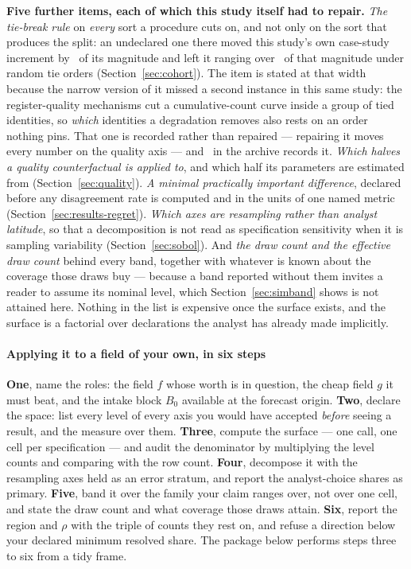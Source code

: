 \textbf{Five further items, each of which this study itself had to
repair.} \emph{The tie-break rule} on \emph{every} sort a procedure cuts on,
and not only on the sort that produces the split: an undeclared one there
moved this study's own case-study increment by
\tiebreakShiftPct\ of its magnitude and left it ranging over
\tiebreakRangeSharePct\ of that magnitude under random tie orders
(Section~\ref{sec:cohort}). The item is stated at that width because the
narrow version of it missed a second instance in this same study: the
register-quality mechanisms cut a cumulative-count curve inside a group of
tied identities, so \emph{which} identities a degradation removes also rests
on an order nothing pins. That one is recorded rather than
repaired --- repairing it moves every number on the quality axis --- and
\reproduceguide\ in the archive records it. \emph{Which halves a quality
counterfactual is applied to}, and which half its parameters are estimated
from (Section~\ref{sec:quality}). \emph{A minimal practically important
difference}, declared before any disagreement rate is computed and in the
units of one named metric (Section~\ref{sec:results-regret}).
\emph{Which axes are resampling rather than analyst latitude}, so that a
decomposition is not read as specification sensitivity when it is sampling
variability (Section~\ref{sec:sobol}). And \emph{the draw count and the
\emph{effective} draw count} behind every band, together with whatever is
known about the coverage those draws buy --- because a band reported without
them invites a reader to assume its nominal level, which
Section~\ref{sec:simband} shows is not attained here. Nothing in the list is
expensive once the surface exists, and the surface is a factorial over
declarations the analyst has already made implicitly.

\paragraph{Applying it to a field of your own, in six steps}
\textbf{One}, name the roles: the field $f$ whose worth is in question, the
cheap field $g$ it must beat, and the intake block $B_0$ available at the
forecast origin. \textbf{Two}, declare the space: list every level of every
axis you would have accepted \emph{before} seeing a result, and the measure
over them. \textbf{Three}, compute the surface --- one call, one cell per
specification --- and audit the denominator by multiplying the level counts
and comparing with the row count. \textbf{Four}, decompose it with the
resampling axes held as an error stratum, and report the analyst-choice shares
as primary. \textbf{Five}, band it over the family your claim ranges over,
not over one cell, and state the draw count and what coverage those draws
attain. \textbf{Six}, report the region and $\rho$ with the triple of counts
they rest on, and refuse a direction below your declared minimum resolved
share. The package below performs steps three to six from a tidy frame.

